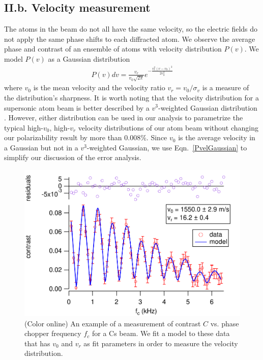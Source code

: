 \documentclass[twocolumn,prl,showpacs,superscriptaddress,longbibliography]{revtex4-1}   %
\newcommand{\eqnref}[1]{Eqn.~\eqref{#1}}
\begin{document}
\subsection{II.b. Velocity measurement}

The atoms in the beam do not all have the same velocity, so the electric fields do not apply the same phase shifts to each diffracted atom.
We observe the average phase and contrast of an ensemble of atoms with velocity distribution $P(v)$. 
We model $P(v)$ as a Gaussian distribution
\begin{align}
	P(v)dv = \frac{v_r}{v_0\sqrt{2\pi}}e^{-\frac{v_r^2(v-v_0)^2}{2v_0^2}}
	\label{PvelGaussian}
\end{align}
where $v_0$ is the mean velocity and the velocity ratio $v_r = v_0/\sigma_v$ is a measure of the distribution's sharpness. It is worth noting that the velocity distribution for a supersonic atom beam is better described by a $v^3$-weighted Gaussian distribution
\cite{Berman1997}. However, either distribution can be used in our analysis to parametrize the typical high-$v_0$, high-$v_r$ velocity distributions of our atom beam without changing our polarizability result by more than 0.008\%. Since $v_0$ is the average velocity in a Gaussian but not in a $v^3$-weighted Gaussian, we use \eqnref{PvelGaussian} to simplify our discussion of the error analysis. 


\begin{figure}
\includegraphics[width=\linewidth,keepaspectratio]{CvCF_150420_ca.pdf}
\caption{\label{CvCFExample}(Color online) An example of a measurement of contrast $C$ vs. phase chopper frequency $f_c$ for a Cs beam. We fit a model to these data that has $v_0$ and $v_r$ as fit parameters in order to measure the velocity distribution.}
\end{figure}
\end{document}
